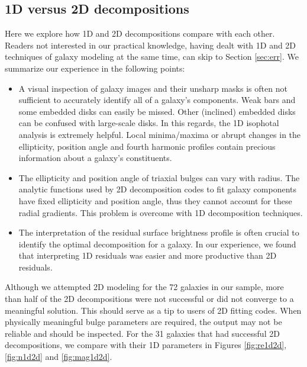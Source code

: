 \documentclass[preprint2]{emulateapj}
\begin{document}


\subsection{1D versus 2D decompositions}
Here we explore how 1D and 2D decompositions compare with each other. 
Readers not interested in our practical knowledge, 
having dealt with 1D and 2D techniques of galaxy modeling at the same time, can skip to Section \ref{sec:err}. 
We summarize our experience in the following points:
\begin{itemize}
\item A visual inspection of galaxy images and their unsharp masks is often not sufficient to accurately identify all of a galaxy's components. 
Weak bars and some embedded disks can easily be missed. 
Other (inclined) embedded disks can be confused with large-scale disks.
In this regards, the 1D isophotal analysis is extremely helpful. 
Local minima/maxima or abrupt changes in the ellipticity, position angle and fourth harmonic profiles contain precious information 
about a galaxy's constituents.
\item The ellipticity and position angle of triaxial bulges can vary with radius.
The analytic functions used by 2D decomposition codes to fit galaxy components have fixed ellipticity and position angle, 
thus they cannot account for these radial gradients. 
This problem is overcome with 1D decomposition techniques.
\item The interpretation of the residual surface brightness profile is often crucial to identify the optimal decomposition for a galaxy. 
In our experience, we found that interpreting 1D residuals was easier and more productive than 2D residuals.
\end{itemize}
Although we attempted 2D modeling for the 72 galaxies in our sample, 
more than half of the 2D decompositions were not successful or did not converge to a meaningful solution. 
This should serve as a tip to users of 2D fitting codes. 
When physically meaningful bulge parameters are required, 
the output may not be reliable and should be inspected.
For the 31 galaxies that had successful 2D decompositions, 
we compare with their 1D parameters in Figures \ref{fig:re1d2d}, \ref{fig:n1d2d} and \ref{fig:mag1d2d}.
\end{document}
